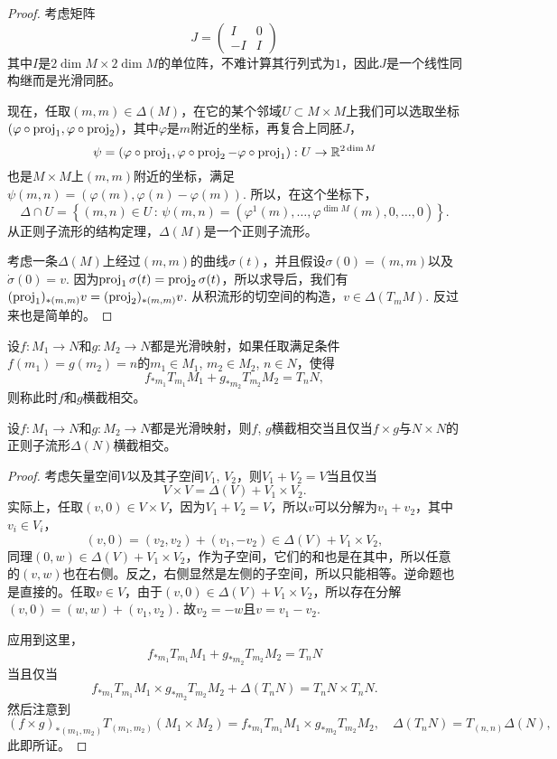 \begin{proof}
考虑矩阵
\[
	J=\begin{pmatrix}
	I&0\\
	-I&I
	\end{pmatrix}
\]
其中$I$是$2\dim M\times 2\dim M$的单位阵，不难计算其行列式为$1$，因此$J$是一个线性同构继而是光滑同胚。

现在，任取$(m,m)\in\Delta(M)$，在它的某个邻域$U\subset M\times M$上我们可以选取坐标$(\varphi\circ \operatorname{proj}_1,\varphi\circ \operatorname{proj}_2)$，其中$\varphi$是$m$附近的坐标，再复合上同胚$J$，
\[
	\psi=(\varphi\circ \operatorname{proj}_1,\varphi\circ \operatorname{proj}_2-\varphi\circ \operatorname{proj}_1):U\to \mathbb{R}^{2\dim M}
\]
也是$M\times M$上$(m,m)$附近的坐标，满足$\psi(m,n)=(\varphi(m),\varphi(n)-\varphi(m))$. 所以，在这个坐标下，
\[
	\Delta \cap U=\left\{(m,n)\in U\,:\, \psi(m,n)=(\varphi^1(m),\dots,\varphi^{\dim M}(m),0,\dots,0)\right\}.
\]
从正则子流形的结构定理，$\Delta(M)$是一个正则子流形。

考虑一条$\Delta(M)$上经过$(m,m)$的曲线$\sigma(t)$，并且假设$\sigma(0)=(m,m)$以及$\dot\sigma(0)=v$. 因为$\operatorname{proj}_1\sigma(t)=\operatorname{proj}_2\sigma(t)$，所以求导后，我们有$(\operatorname{proj}_1)_{*(m,m)}v=(\operatorname{proj}_2)_{*(m,m)}v$. 从积流形的切空间的构造，$v\in \Delta(T_mM)$. 反过来也是简单的。
\end{proof}

\begin{para}[横截相交映射]
设$f:M_1\to N$和$g:M_2\to N$都是光滑映射，如果任取满足条件$f(m_1)=g(m_2)=n$的$m_1\in M_1$, $m_2\in M_2$, $n\in N$，使得
\[
	f_{*m_1}T_{m_1}M_1+g_{*m_2}T_{m_2}M_2=T_{n}N,
\]
则称此时$f$和$g$横截相交。
\end{para}

\begin{lem}
设$f:M_1\to N$和$g:M_2\to N$都是光滑映射，则$f$, $g$横截相交当且仅当$f\times g$与$N\times N$的正则子流形$\Delta(N)$横截相交。
\end{lem}

\begin{proof}
考虑矢量空间$V$以及其子空间$V_1$, $V_2$，则$V_1+V_2=V$当且仅当
\[
	V\times V=\Delta(V)+V_1\times V_2.
\]
实际上，任取$(v,0)\in V\times V$，因为$V_1+V_2=V$，所以$v$可以分解为$v_1+v_2$，其中$v_i\in V_i$，
\[
	(v,0)=(v_2,v_2)+(v_1,-v_2)\in \Delta(V)+V_1\times V_2,
\]
同理$(0,w)\in \Delta(V)+V_1\times V_2$，作为子空间，它们的和也是在其中，所以任意的$(v,w)$也在右侧。反之，右侧显然是左侧的子空间，所以只能相等。逆命题也是直接的。任取$v\in V$，由于$(v,0)\in \Delta(V)+V_1\times V_2$，所以存在分解$(v,0)=(w,w)+(v_1,v_2)$. 故$v_2=-w$且$v=v_1-v_2$.

应用到这里，
\[
	f_{*m_1}T_{m_1}M_1+g_{*m_2}T_{m_2}M_2=T_{n}N
\]
当且仅当
\[
	f_{*m_1}T_{m_1}M_1\times g_{*m_2}T_{m_2}M_2+\Delta(T_nN)=T_nN\times T_nN.
\]
然后注意到
\[
	(f\times g)_{*(m_1,m_2)}T_{(m_1,m_2)}(M_1\times M_2)=f_{*m_1}T_{m_1}M_1\times g_{*m_2}T_{m_2}M_2,\quad\Delta(T_nN)=T_{(n,n)}\Delta(N),
\]
此即所证。
\end{proof}

